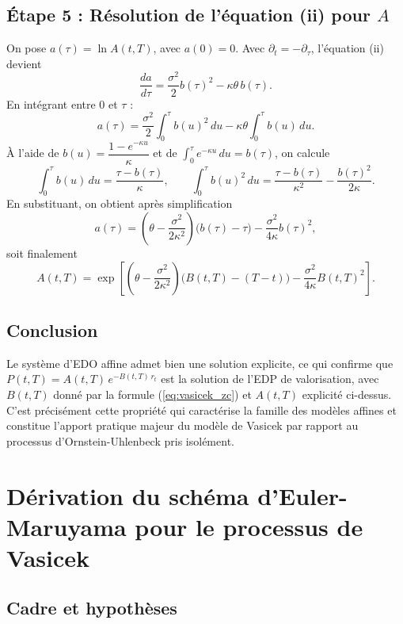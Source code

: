 \subsection*{Étape 5 : Résolution de l'équation (ii) pour $A$}

On pose $a(\tau) = \ln A(t,T)$, avec $a(0)=0$. Avec $\partial_t = -\partial_\tau$, l'équation (ii) devient
\[
    \frac{da}{d\tau} = \frac{\sigma^2}{2}b(\tau)^2 - \kappa\theta\,b(\tau).
\]
En intégrant entre $0$ et $\tau$ :
\[
    a(\tau) = \frac{\sigma^2}{2}\int_0^\tau b(u)^2\,du - \kappa\theta\int_0^\tau b(u)\,du.
\]
À l'aide de $b(u) = \dfrac{1-e^{-\kappa u}}{\kappa}$ et de $\int_0^\tau e^{-\kappa u}\,du = b(\tau)$, on calcule
\[
    \int_0^\tau b(u)\,du = \frac{\tau - b(\tau)}{\kappa},
    \qquad
    \int_0^\tau b(u)^2\,du = \frac{\tau - b(\tau)}{\kappa^2} - \frac{b(\tau)^2}{2\kappa}.
\]
En substituant, on obtient après simplification
\[
    a(\tau) = \left(\theta - \frac{\sigma^2}{2\kappa^2}\right)\bigl(b(\tau) - \tau\bigr) - \frac{\sigma^2}{4\kappa}b(\tau)^2,
\]
soit finalement
\[
    A(t,T) = \exp\!\left[\left(\theta - \frac{\sigma^2}{2\kappa^2}\right)\bigl(B(t,T)-(T-t)\bigr) - \frac{\sigma^2}{4\kappa}B(t,T)^2\right].
\]

\subsection*{Conclusion}

Le système d'EDO affine admet bien une solution explicite, ce qui confirme que $P(t,T) = A(t,T)\,e^{-B(t,T)\,r_t}$ est la solution de l'EDP de valorisation, avec $B(t,T)$ donné par la formule (\ref{eq:vasicek_zc}) et $A(t,T)$ explicité ci-dessus. C'est précisément cette propriété qui caractérise la famille des modèles affines et constitue l'apport pratique majeur du modèle de Vasicek par rapport au processus d'Ornstein-Uhlenbeck pris isolément.

\section{Dérivation du schéma d'Euler-Maruyama pour le processus de Vasicek}
\label{ann:euler_maruyama}

\subsection*{Cadre et hypothèses}

